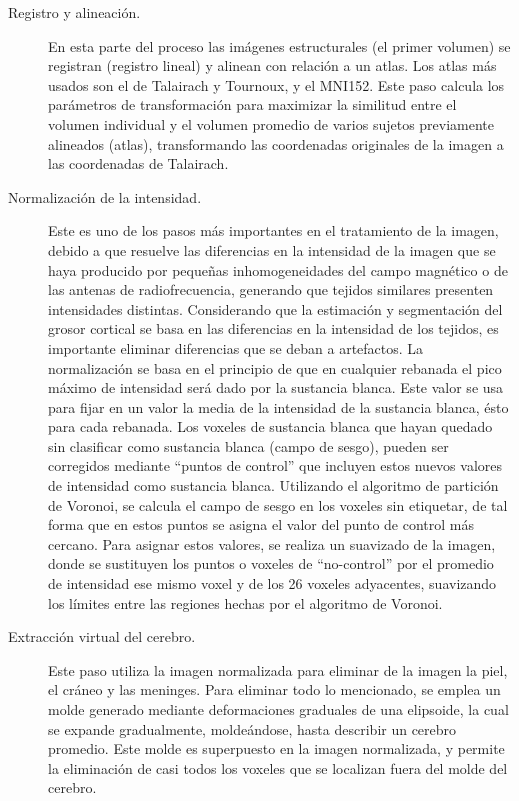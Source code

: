 \begin{description}

 \item [Registro y alineación.] En esta parte del proceso las imágenes estructurales (el primer volumen) se
registran (registro lineal) y alinean con relación a un atlas. Los atlas más usados son el de Talairach y
Tournoux, y el MNI152. Este paso calcula los parámetros de transformación para maximizar la
similitud entre el volumen individual y el volumen promedio de varios sujetos previamente alineados
(atlas), transformando las coordenadas originales de la imagen a las coordenadas de Talairach.

\item [Normalización de la intensidad.] Este es uno de los pasos más importantes en el tratamiento de la
imagen, debido a que resuelve las diferencias en la intensidad de la imagen que se haya producido por
pequeñas inhomogeneidades del campo magnético o de las antenas de radiofrecuencia, generando que
tejidos similares presenten intensidades distintas. Considerando que la estimación y segmentación del
grosor cortical se basa en las diferencias en la intensidad de los tejidos, es importante eliminar diferencias que se deban a artefactos. La normalización se basa en el principio de que en cualquier
rebanada el pico máximo de intensidad será dado por la sustancia blanca. Este valor se usa para fijar en
un valor la media de la intensidad de la sustancia blanca, ésto para cada rebanada. Los voxeles de
sustancia blanca que hayan quedado sin clasificar como sustancia blanca (campo de sesgo), pueden ser
corregidos mediante ``puntos de control'' que incluyen estos nuevos valores de intensidad como
sustancia blanca. Utilizando el algoritmo de partición de Voronoi, se calcula el campo de sesgo en los
voxeles sin etiquetar, de tal forma que en estos puntos se asigna el valor del punto de control más
cercano. Para asignar estos valores, se realiza un suavizado de la imagen, donde se sustituyen los
puntos o voxeles de ``no-control'' por el promedio de intensidad ese mismo voxel y de los 26 voxeles
adyacentes, suavizando los límites entre las regiones hechas por el algoritmo de Voronoi.

\item [Extracción virtual del cerebro.] Este paso utiliza la imagen normalizada para eliminar de la imagen la
piel, el cráneo y las meninges. Para eliminar todo lo mencionado, se emplea un molde generado
mediante deformaciones graduales de una elipsoide, la cual se expande gradualmente, moldeándose,
hasta describir un cerebro promedio. Este molde es superpuesto en la imagen normalizada, y permite la
eliminación de casi todos los voxeles que se localizan fuera del molde del cerebro.


\end{description}
